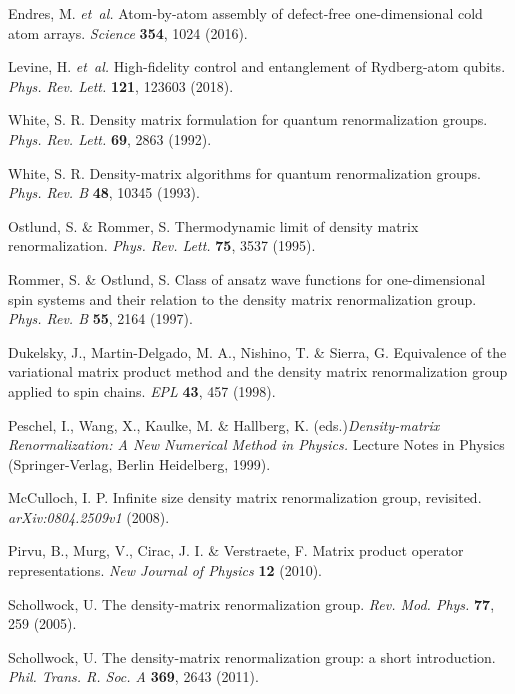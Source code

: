 \documentclass[prl,nobalancelastpage,superscriptaddress,twocolumn,nofootinbib]{revtex4}
\begin{document}

\begin{thebibliography}{}
 Endres, M. \emph{et~al.} Atom-by-atom assembly of defect-free one-dimensional cold atom arrays. \emph{Science} \textbf{354}, 1024 (2016).

 Levine, H. \emph{et~al.} High-fidelity control and entanglement of Rydberg-atom qubits. \emph{Phys. Rev. Lett.} \textbf{121}, 123603 (2018).

 White, S. R. Density matrix formulation for quantum renormalization groups. \emph{Phys. Rev. Lett.} \textbf{69}, 2863 (1992).

 White, S. R. Density-matrix algorithms for quantum renormalization groups. \emph{Phys. Rev. B} \textbf{48}, 10345 (1993).

 Ostlund, S. \& Rommer, S. Thermodynamic limit of density matrix renormalization. \emph{Phys. Rev. Lett.} \textbf{75}, 3537 (1995).

 Rommer, S. \& Ostlund, S. Class of ansatz wave functions for one-dimensional spin systems and their relation to the density matrix renormalization group. \emph{Phys. Rev. B} \textbf{55}, 2164 (1997).

 Dukelsky, J., Martin-Delgado, M. A., Nishino, T. \& Sierra, G. Equivalence of the variational matrix product method and the density matrix renormalization group applied to spin chains. \emph{EPL} \textbf{43}, 457 (1998).

 Peschel, I., Wang, X., Kaulke, M. \& Hallberg, K. (eds.)\emph{Density-matrix Renormalization: A New Numerical Method in Physics.} Lecture Notes in Physics (Springer-Verlag, Berlin Heidelberg, 1999). 

 McCulloch, I. P. Infinite size density matrix renormalization group, revisited. \emph{arXiv:0804.2509v1} (2008).

 Pirvu, B., Murg, V., Cirac, J. I. \& Verstraete, F. Matrix product operator representations. \emph{New Journal of Physics} \textbf{12} (2010).

Schollwock, U. The density-matrix renormalization group. \emph{Rev. Mod. Phys.} \textbf{77}, 259 (2005).

 Schollwock, U. The density-matrix renormalization group: a short introduction. \emph{Phil. Trans. R. Soc. A} \textbf{369}, 2643 (2011).


\end{thebibliography}
\end{document}
